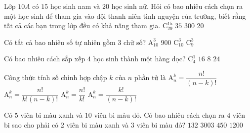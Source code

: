 \begin{ex}%
	Lớp $10A$ có $15$ học sinh nam và $20$ học sinh nữ. Hỏi có bao nhiêu cách chọn ra một học sinh để tham gia vào đội thanh niên tình nguyện của trường, biết rằng tất cả các bạn trong lớp đều có khả năng tham gia.
	\choice
	{$\mathrm{C}_{29}^{15}$}
	{\True $35$}
	{$300$}
	{$20$}
\end{ex}

\begin{ex}%
	Có tất cả bao nhiêu số tự nhiên gồm $3$ chữ số?
	\choice
	{$\mathrm{A}_{10}^{3}$}
	{\True $900$}
	{$\mathrm{C}_{ 10}^{3}$}
	{$\mathrm{C}_{9}^{3}$}
\end{ex}

\begin{ex}%
	Có bao nhiêu cách sắp xếp $4$ học sinh thành một hàng dọc?
	\choice
	{$\mathrm{C}_{4}^{1}$}
	{$16$}
	{$8$}
	{\True $24$}
\end{ex}

\begin{ex}%
	Công thức tính số chỉnh hợp chập $k$ của $n$ phần tử là
	\choice
	{\True $\mathrm{A}_{n}^{k}=\dfrac{n!}{(n-k)!}$}
	{$\mathrm{A}_{n}^{k}=\dfrac{n!}{k!(n-k)!}$}
	{$\mathrm{A}_{n}^{k}=\dfrac{n!}{k!}$}
	{$\mathrm{A}_{n}^{k}=\dfrac{k!}{(n-k)!}$}
\end{ex}

\begin{ex}%
	Có $5$ viên bi màu xanh và $10$ viên bi màu đỏ. Có bao nhiêu cách chọn ra $4$ viên bi sao cho phải có $2$ viên bi màu xanh và $3$ viên bi màu đỏ?
	\choice
	{$132$}
	{$3003$}
	{$450$}
	{\True $1200$}
\end{ex}

